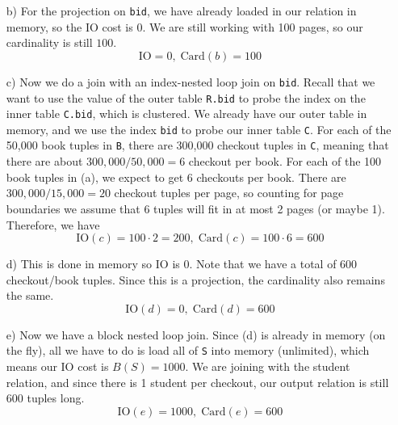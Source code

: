 \documentclass{article}
\begin{document}
\begin{example}
\begin{enumerate}
        \item[b)] For the projection on \texttt{bid}, we have already loaded in our relation in memory, so the IO cost is $0$. We are still working with 100 pages, so our cardinality is still $100$. 
          \begin{equation}
            \mathrm{IO} = 0, \; \mathrm{Card}(b) = 100 
          \end{equation} 

        \item[c)] Now we do a join with an index-nested loop join on \texttt{bid}. Recall that we want to use the value of the outer table \texttt{R.bid} to probe the index on the inner table \texttt{C.bid}, which is clustered. We already have our outer table in memory, and we use the index \texttt{bid} to probe our inner table \texttt{C}. For each of the 50,000 book tuples in \texttt{B}, there are 300,000 checkout tuples in \texttt{C}, meaning that there are about $300,000/50,000 = 6$ checkout per book. For each of the 100 book tuples in (a), we expect to get 6 checkouts per book. There are $300,000 / 15,000 = 20$ checkout tuples per page, so counting for page boundaries we assume that 6 tuples will fit in at most 2 pages (or maybe 1). Therefore, we have 
          \begin{equation}
            \mathrm{IO}(c) = 100 \cdot 2 = 200, \; \mathrm{Card}(c) = 100 \cdot 6 = 600
          \end{equation}

        \item[d)] This is done in memory so IO is $0$. Note that we have a total of 600 checkout/book tuples. Since this is a projection, the cardinality also remains the same. 
          \begin{equation}
            \mathrm{IO}(d) = 0, \; \mathrm{Card}(d) = 600 
          \end{equation}

        \item[e)] Now we have a block nested loop join. Since (d) is already in memory (on the fly), all we have to do is load all of \texttt{S} into memory (unlimited), which means our IO cost is $B(S) = 1000$. We are joining with the student relation, and since there is 1 student per checkout, our output relation is still 600 tuples long. 
          \begin{equation}
            \mathrm{IO}(e) = 1000, \; \mathrm{Card}(e) = 600
          \end{equation}


\end{enumerate}
\end{example}
\end{document}
